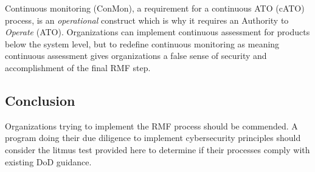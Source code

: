 Continuous monitoring (ConMon), a requirement for a continuous ATO (cATO) process, is an \textit{operational} construct which is why it requires an Authority to \textit{Operate} (ATO). Organizations can implement continuous assessment for products below the system level, but to redefine continuous monitoring as meaning continuous assessment gives organizations a false sense of security and accomplishment of the final RMF step.

\subsection{Conclusion}
Organizations trying to implement the RMF process should be commended. A program doing their due diligence to implement cybersecurity principles should consider the litmus test provided here to determine if their processes comply with existing DoD guidance.
